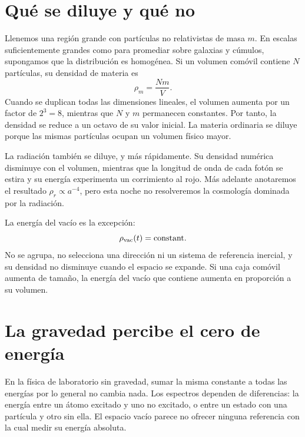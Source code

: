 \section{Qué se diluye y qué no}

Llenemos una región grande con partículas no relativistas de masa \(m\). En escalas suficientemente grandes como para promediar sobre galaxias y cúmulos, supongamos que la distribución es homogénea. Si un volumen comóvil contiene \(N\) partículas, su densidad de materia es
\begin{equation}
\rho_m=\frac{Nm}{V}.
\end{equation}
Cuando se duplican todas las dimensiones lineales, el volumen aumenta por un factor de \(2^3=8\), mientras que \(N\) y \(m\) permanecen constantes. Por tanto, la densidad se reduce a un octavo de su valor inicial. La materia ordinaria se diluye porque las mismas partículas ocupan un volumen físico mayor.

La radiación también se diluye, y más rápidamente. Su densidad numérica disminuye con el volumen, mientras que la longitud de onda de cada fotón se estira y su energía experimenta un corrimiento al rojo. Más adelante anotaremos el resultado \(\rho_r\propto a^{-4}\), pero esta noche no resolveremos la cosmología dominada por la radiación.

La energía del vacío es la excepción:
\begin{equation}
\rho_{\rm vac}(t)=\text{constant}.
\label{eq:l08-rho-vac-constant}
\end{equation}
No se agrupa, no selecciona una dirección ni un sistema de referencia inercial, y su densidad no disminuye cuando el espacio se expande. Si una caja comóvil aumenta de tamaño, la energía del vacío que contiene aumenta en proporción a su volumen.


\section{La gravedad percibe el cero de energía}

En la física de laboratorio sin gravedad, sumar la misma constante a todas las energías por lo general no cambia nada. Los espectros dependen de diferencias: la energía entre un átomo excitado y uno no excitado, o entre un estado con una partícula y otro sin ella. El espacio vacío parece no ofrecer ninguna referencia con la cual medir su energía absoluta.

